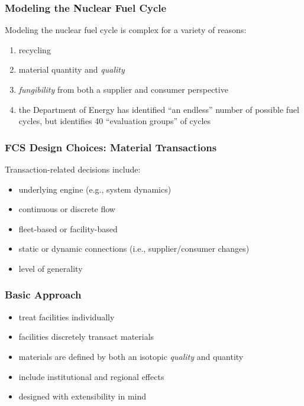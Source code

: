 
\begin{frame}[ctb!]
  \frametitle{Modeling the Nuclear Fuel Cycle}

  Modeling the nuclear fuel cycle is complex for a variety of reasons:

  \begin{enumerate}
    \item recycling
    \item material quantity and \textit{quality}
    \item \textit{fungibility} from both a supplier and consumer perspective
    \item the Department of Energy has identified ``an endless'' number of
      possible fuel cycles, but identifies 40 ``evaluation groups'' of cycles
      \cite{wigeland_evaluation_2013}
  \end{enumerate}

\end{frame}

\begin{frame}[ctb!]
  \frametitle{FCS Design Choices: Material Transactions}

  Transaction-related decisions include:
  \begin{itemize}
    \item underlying engine (e.g., system dynamics)
    \item continuous or discrete flow
    \item fleet-based or facility-based
    \item static or dynamic connections (i.e., supplier/consumer changes)
    \item level of generality
  \end{itemize}

\end{frame}

\begin{frame}[ctb!]
  \frametitle{Basic \Cyclus Approach}

  \begin{itemize}
    \item treat facilities individually
    \item facilities discretely transact materials
    \item materials are defined by both an isotopic \textit{quality} and
      quantity
    \item include institutional and regional effects
    \item designed with extensibility in mind
  \end{itemize}

\end{frame}


